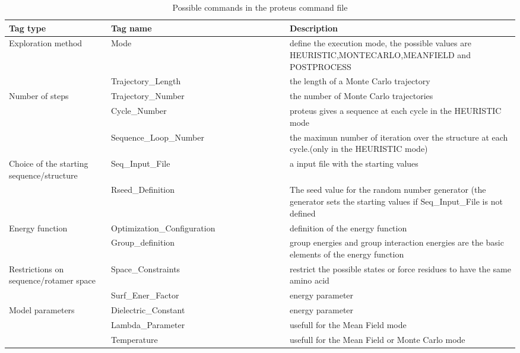 \documentclass[a4paper,12pt]{article}
\begin{document}
    \begin{table}[!htbp]
      \centering


      \begin{tabular}{|p{0.2\linewidth}|p{0.35\linewidth}|p{0.45\linewidth}|}

        \hline
        Tag type  & Tag name & Description \\
        \hline
          Exploration method  & Mode &  define the execution mode, the possible values are  HEURISTIC,MONTECARLO,MEANFIELD and POSTPROCESS  \\  \hline    
                        & Trajectory\_Length  &  the length of a Monte Carlo trajectory \\  \cline{2-3}
        Number of steps & Trajectory\_Number  &  the number of Monte Carlo trajectories    \\  \cline{2-3}
                        & Cycle\_Number  &    proteus gives a sequence at each cycle in the HEURISTIC mode   \\ \cline{2-3}  
                        & Sequence\_Loop\_Number  &  the maximun number of iteration over the structure at each cycle.(only in the HEURISTIC mode)    \\ \hline  
        Choice of the starting sequence/structure &  Seq\_Input\_File &   a input file with the starting values    \\ \cline{2-3}
                                                  & Rseed\_Definition  &   The seed value for the random number generator (the generator sets the starting values if Seq\_Input\_File is not defined   \\    \hline 
        Energy function &  Optimization\_Configuration &   definition of the energy function\\               \cline{2-3}
                        &  Group\_definition &   group energies and group interaction energies are the basic elements of the energy function\\  \hline  
        Restrictions on sequence/rotamer space & Space\_Constraints   &  restrict the possible states or force residues to have the same amino acid  \\ \hline                
                         & Surf\_Ener\_Factor  &   energy parameter\\               \cline{2-3}
        Model parameters & Dielectric\_Constant &  energy parameter \\               \cline{2-3}
                         & Lambda\_Parameter &  usefull for the Mean Field mode \\              \cline{2-3} 
                         & Temperature & usefull for the Mean Field or Monte Carlo mode  \\          \hline     

      \end{tabular} 

      \caption{ Possible commands in the proteus command file}      

      \label{table1}

  \end{table}
\end{document}
